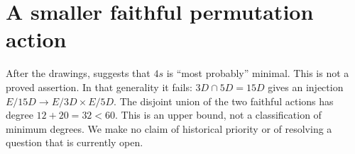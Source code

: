 \section{A smaller faithful permutation action}
After the drawings, \cite[p.~6]{source} suggests that $4s$ is ``most probably''
minimal. This is not a proved assertion. In that generality it fails:
$3D\cap5D=15D$ gives an injection
$E/15D\longrightarrow E/3D\times E/5D$. The disjoint union of the two
faithful actions has degree $12+20=32<60$. This is an upper bound, not
a classification of minimum degrees. We make no claim of historical
priority or of resolving a question that is currently open.
